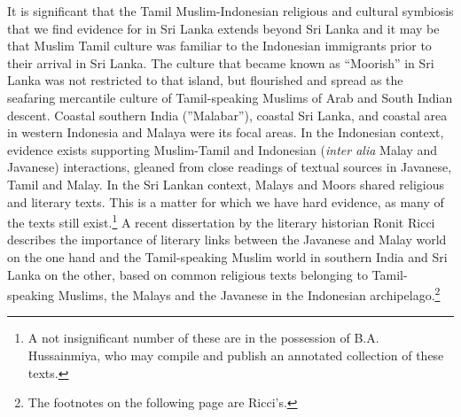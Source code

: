 It is significant that the Tamil Muslim-Indonesian religious and cultural symbiosis that we find evidence for in Sri Lanka extends beyond Sri Lanka and it may be that Muslim Tamil culture was familiar to the Indonesian immigrants prior to their arrival in Sri Lanka. The culture that became known as ``Moorish'' in Sri Lanka was not restricted to that island, but flourished and spread as the seafaring mercantile culture of Tamil-speaking Muslims of Arab and South Indian descent. Coastal southern India (''Malabar''), coastal Sri Lanka, and coastal area in western Indonesia and Malaya were its focal areas. In the Indonesian context, evidence exists supporting Muslim-Tamil and Indonesian (\textit{inter alia} Malay and Javanese) interactions, gleaned from close readings of textual sources in Javanese, Tamil and Malay. In the Sri Lankan context, Malays and Moors shared religious and literary texts. This is a matter for which we have hard evidence, as many of the texts still exist.\footnote{A
  not insignificant number of these are in the possession of B.A. Hussainmiya, who may compile and publish an annotated collection of these texts.
} 
A recent dissertation by the literary historian Ronit Ricci \citep{Ricci2006} describes the importance of literary links between the Javanese and Malay world on the one hand and the Tamil-speaking Muslim world in southern India and Sri Lanka on the other, based on common religious texts belonging to Tamil-speaking Muslims, the Malays and the Javanese in the Indonesian archipelago.\footnote{The
  footnotes on the following page are Ricci's.
}

